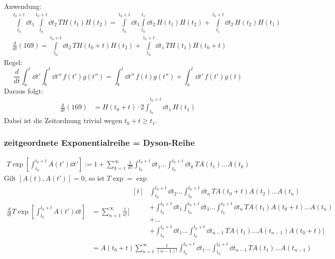 \documentclass[a4paper]{scrartcl}
\begin{document}
{Anwendung:
\begin{align}
& \int\limits_{t_0}^{t_0+t} \dd t_1 \int\limits_{t_0}^{t_0 + t} \dd t_2 \, T H(t_1) H(t_2) = \int\limits_{t_0}^{t_0 + t} \dd t_1   \int\limits_{t_0}^{t_1} \dd t_2 \, H(t_1) H(t_2) +  \int\limits_{t_1}^{t_0+t} \dd t_2 \, H(t_2) H(t_1) \\
& \frac d {dt} (169) = \int\limits_{t_0}^{t_0+t} \dd t_2 \, T H(t_0+t) H(t_2) + \int\limits_{t_0}^{t_0+t} \dd t_1 \, T H(t_1)H(t_0+t)
\end{align}
Regel:
$$ \frac d {dt} \int_a^t \dd t' \int_b^t \dd t'' \, f(t') g(t'') = \int_b^t \dd t'' \, f(t) g(t'') + \int_a^t \dd t' \, f(t') g(t)$$
Daraus folgt:
\begin{align}
\frac d {dt} (169) & = H(t_0 + t) \cdot 2\dot \int_{t_0}^{t_0 + t} \dd t_1 \, H(t_1)
\end{align}
Dabei ist die Zeitordnung trivial wegen $t_0 + t \geq t_1$.

\subsubsection*{zeitgeordnete Exponentialreihe = Dyson-Reihe}
\begin{align}
T \exp \left[ \int_{t_0}^{t_0+t} A(t') \dd t' \right] := 1 + \sum_{k=1}^\infty \frac 1  {R!} \int_{t_0}^{t_0+t} \dd t_1 \ldots \int_{t_0}^{t_0 + t} \dd t_k \, T A(t_1) \ldots A(t_k)
\end{align}
Gilt $[A(t), A(t')] = 0$, so ist $T \exp = \exp$
\begin{align*}
\frac d{dt} T \exp \left[ \int_{t_0}^{t_0+t} A(t') \dd t \right] &=  \sum_{n=1}^\infty \frac1{n!}
\Big[
\begin{aligned}[t]
& \int_{t_0}^{t_0 + t} \dd t_2 \ldots \int_{t_0}^{t_0+t} \dd t_n \,  T A(t_0+t) A(t_2) \ldots A(t_n)  \\
& + \int_{t_0}^{t_0 + t} \dd t_1 \int_{t_0}^{t_0+t} \dd t_3 \ldots \int_{t_0}^{t_0+t} \dd t_n \,  TA(t_1) A(t_0 + t) \ldots A(t_n) \\ & +  \ldots \\
 & + \int_{t_0}^{t_0+t} \dd t_1 \ldots \int_{t_0}^{t_0+t} \dd t_{n-1} \, T A(t_1) \ldots A(t_{n-1}) A(t_0+t) \Big]
\end{aligned}  \\ 
& = A(t_0+t) \sum_{n=1}^\infty \frac1{(n-1)!} \int_{t_0}^{t_0+t}\dd t_1 \ldots \int_{t_0}^{t_0 +t} \dd t_{n-1} \, T A(t_1) \ldots A(t_{n-1})
\end{align*}

}
\end{document}
